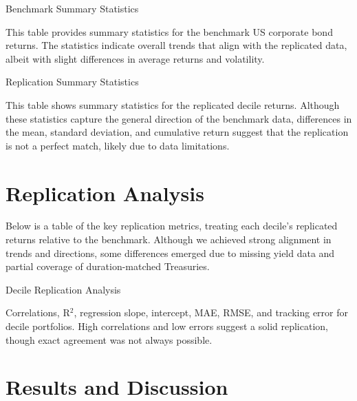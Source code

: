 \documentclass[12pt]{article}
\begin{document}
\begin{table}[htbp]
\centering
\caption{Benchmark Summary Statistics}
{\footnotesize
\renewcommand{\arraystretch}{0.9}
\resizebox{\textwidth}{!}{%
  
}
}
\caption*{\footnotesize This table provides summary statistics for the benchmark US corporate bond returns. The statistics indicate overall trends that align with the replicated data, albeit with slight differences in average returns and volatility.}
\label{table:benchmark_summary}
\end{table}

\begin{table}[htbp]
\centering
\caption{Replication Summary Statistics}
{\footnotesize
\renewcommand{\arraystretch}{0.9}
\resizebox{\textwidth}{!}{%
  
}
}
\caption*{\footnotesize This table shows summary statistics for the replicated decile returns. Although these statistics capture the general direction of the benchmark data, differences in the mean, standard deviation, and cumulative return suggest that the replication is not a perfect match, likely due to data limitations.}
\label{table:replicate_summary}
\end{table}

\section{Replication Analysis}
Below is a table of the key replication metrics, treating each decile’s replicated returns relative to the benchmark. Although we achieved strong alignment in trends and directions, some differences emerged due to missing yield data and partial coverage of duration-matched Treasuries.

\begin{table}[htbp]
\centering
\caption{Decile Replication Analysis}
\resizebox{\textwidth}{!}{%
  
}
\caption*{\footnotesize Correlations, R$^2$, regression slope, intercept, MAE, RMSE, and tracking error for decile portfolios. High correlations and low errors suggest a solid replication, though exact agreement was not always possible.}
\label{table:analysis}
\end{table}

\section{Results and Discussion}
\end{document}
